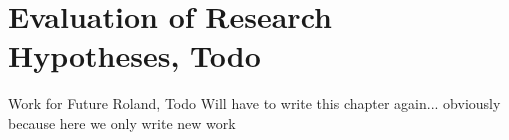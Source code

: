 \section{Evaluation of Research Hypotheses, Todo}
Work for Future Roland, Todo
Will have to write this chapter again... obviously because here we only write new work


